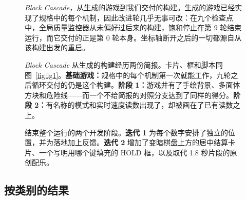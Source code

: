 \begin{figure}[h]
\centering
{}
\caption{\textit{Block Cascade}，从生成的游戏到我们交付的构建。生成的游戏已经实现了规格中的每个机制，因此改进轮几乎无事可改：在九个检查点中，全局质量监控器从未偏好过后来的构建，饱和停止在第 9 轮结束运行，而它交付的正是第 0 轮本身。坐标轴断开之后的一切都源自从该构建出发的重启。}
\label{fig:bc-timeline}
\end{figure}

\begin{figure}[p]
\centering
{}
\caption{\textit{Block Cascade} 从生成的构建经历两份简报。卡片、框和脚本同图~\ref{fig:lg1}。\textbf{基础游戏：}规格中的每个机制第一次就能工作，九轮之后循环交付的仍是这个构建。\textbf{阶段 1：}游戏井有了手绘背景、多面体方块和危险线——而一个不给简报的对照分支达到了同样的得分。\textbf{阶段 2：}有名称的模式和实时速度读数出现了，却被画在了已有读数之上。}
\label{fig:bc1}
\end{figure}

\begin{figure}[t]
\centering
{}
\caption{结束整个运行的两个开发阶段。\textbf{迭代 1} 为每个数字安排了独立的位置，并为落地加上反馈。\textbf{迭代 2} 增加了变暗棋盘上方的居中结算卡片、一个写明用哪个键填充的 HOLD 框，以及取代 1.8 秒片段的原创配乐。}
\label{fig:bc2}
\end{figure}

\subsection{按类别的结果}\label{app:family}
\newcommand{\famtab}[4]{%
\begin{table}[htbp]
\caption{#1}\label{#2}
\centering\small
\begin{tabular}{@{}lrccc@{}}
\toprule
类别 & $N$ & 基线 $\uparrow$ & #3 \\
\midrule
#4
\bottomrule
\end{tabular}
\end{table}}

